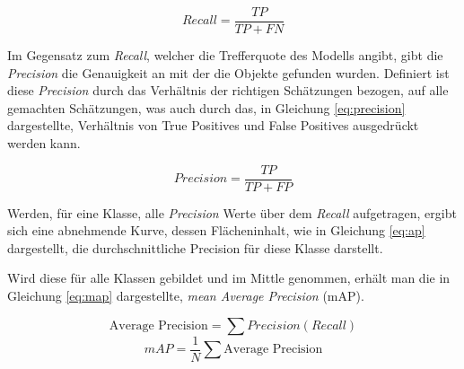 \vspace{0.5cm}
\begin{equation}
  \label{eq:recall}
  Recall = \frac{TP}{TP + FN}
\end{equation}
\vspace{0.5cm}

Im Gegensatz zum \textit{Recall}, welcher die Trefferquote des Modells 
angibt, gibt die \textit{Precision} die Genauigkeit an mit der die Objekte
gefunden wurden.
Definiert ist diese \textit{Precision} durch das 
Verhältnis der richtigen Schätzungen bezogen,
auf alle gemachten Schätzungen,
was auch durch das, in Gleichung \ref{eq:precision}
dargestellte, Verhältnis von True Positives und False Positives 
ausgedrückt werden kann.

\vspace{0.5cm}
\begin{equation}
  \label{eq:precision}
  Precision = \frac{TP}{TP + FP}
\end{equation}
\vspace{0.5cm}

Werden, für eine Klasse, alle \textit{Precision} 
Werte über dem \textit{Recall} aufgetragen, 
ergibt sich eine abnehmende Kurve, 
dessen Flächeninhalt, wie in Gleichung 
\ref{eq:ap} dargestellt, die durchschnittliche 
Precision für diese Klasse darstellt.

Wird diese für alle Klassen gebildet und 
im Mittle genommen, erhält man die in 
Gleichung \ref{eq:map} dargestellte,
\textit{mean Average Precision} (mAP).

\vspace{0.5cm}
\begin{equation}
  \label{eq:ap}
  \text{Average Precision} = \sum Precision(Recall)
\end{equation}
\vspace{0.5cm}
\begin{equation}
  \label{eq:map}
  mAP = \frac{1}{N} \sum \text{Average Precision}
\end{equation}
\vspace{0.5cm}






